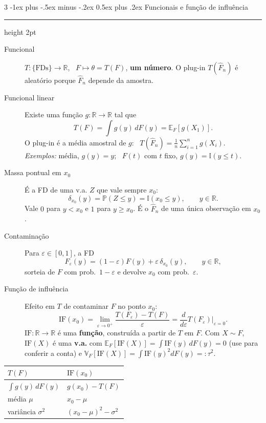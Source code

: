 \documentclass[10pt,landscape]{article}
\makeatletter
\newcommand{\E}{\mathbb{E}}
\newcommand{\V}{\mathbb{V}}
\renewcommand{\P}{\mathbb{P}}
\newcommand{\I}{\mathbb{I}}
\newcommand{\R}{\mathbb{R}}
\newcommand{\IF}{\textrm{IF}}
\newcommand{\Fn}{\hat{F}_n}
\renewcommand{\section}{\@startsection{section}{1}{0mm}%
                                {-1ex plus -.5ex minus -.2ex}%
                                {0.5ex plus .2ex}%
                                {\normalfont\small\bfseries}}
\newcommand{\secrule}{\smallskip \hrule height 2pt \smallskip}
\makeatother
\begin{document}
\begin{multicols}{3}
\section{Funcionais e função de influência}\secrule
\begin{description}
  \item[Funcional] $T:\{\text{FDs}\}\to\R$, \ $F\mapsto\theta=T(F)$, \textbf{um número}. O plug-in $T(\Fn)$ é aleatório porque $\Fn$ depende da amostra.
  \item[Funcional linear] Existe uma função $g:\R\to\R$ tal que
  \[T(F)=\int g(y)\,dF(y)=\E_F[g(X_1)].\]
  O plug-in é a média amostral de $g$: \ $T(\Fn)=\frac1n\sum_{i=1}^ng(X_i)$. \\
  \emph{Exemplos:} média, $g(y)=y$; \ $F(t)$ com $t$ fixo, $g(y)=\I(y\le t)$.
  \item[Massa pontual em $x_0$] É a FD de uma v.a. $Z$ que vale sempre $x_0$:
  \[\delta_{x_0}(y)=\P(Z\le y)=\I(x_0\le y),\qquad y\in\R.\]
  Vale $0$ para $y<x_0$ e $1$ para $y\ge x_0$. É o $\Fn$ de uma única observação em $x_0$.
  \item[Contaminação] Para $\varepsilon\in[0,1]$, a FD
  \[F_{\varepsilon}(y)=(1-\varepsilon)F(y)+\varepsilon\,\delta_{x_0}(y),\qquad y\in\R,\]
  sorteia de $F$ com prob.\ $1-\varepsilon$ e devolve $x_0$ com prob.\ $\varepsilon$.
  \item[Função de influência] Efeito em $T$ de contaminar $F$ no ponto $x_0$:
  \[\IF(x_0)=\lim_{\varepsilon\to0^+}\frac{T(F_\varepsilon)-T(F)}{\varepsilon}=\frac{d}{d\varepsilon}T(F_\varepsilon)\Big|_{\varepsilon=0}.\]
  $\IF:\R\to\R$ é uma \textbf{função}, construída a partir de $T$ em $F$. Com $X\sim F$, $\IF(X)$ é uma \textbf{v.a.} com $\E_F[\IF(X)]=\int\IF(y)\,dF(y)=0$ (use para conferir a conta) e $\V_F[\IF(X)]=\int\IF(y)^2dF(y)=:\tau^2$.
\end{description}

\begin{center}
\begin{tabular}{ll}
\toprule
$T(F)$ & $\IF(x_0)$ \\
\midrule
$\int g(y)\,dF(y)$ & $g(x_0)-T(F)$ \\
média $\mu$ & $x_0-\mu$ \\
variância $\sigma^2$ & $(x_0-\mu)^2-\sigma^2$ \\
\bottomrule
\end{tabular}
\end{center}


\end{multicols}
\end{document}
